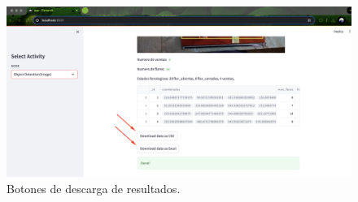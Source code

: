 \begin{figure}[h]
	\centering
	\includegraphics[scale=0.13]{./Figures/botonesinf.png}
	\caption{Botones de descarga de resultados.}
	\label{fig:botonesinf}
\end{figure}
%




